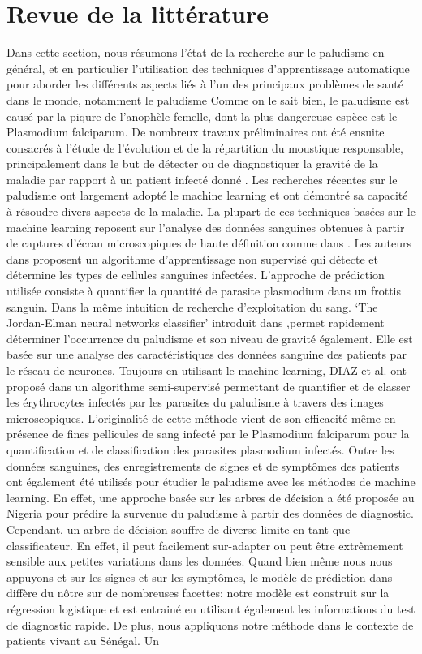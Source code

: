\section{Revue de la littérature}\label{Revue de la littérature}
Dans cette section, nous résumons l’état de la recherche sur le paludisme en général, et en particulier l’utilisation des techniques d’apprentissage automatique pour aborder les différents aspects liés à l’un des principaux problèmes de santé dans le monde, notamment le paludisme
Comme on le sait bien, le paludisme est causé par la piqure de l’anophèle femelle, dont la plus dangereuse espèce est le Plasmodium falciparum. De nombreux travaux préliminaires ont été ensuite consacrés à l’étude de l’évolution et de la répartition du moustique responsable, principalement dans le but de détecter ou de diagnostiquer la gravité de la maladie par rapport à un patient infecté donné \cite{Fe03,Al09}. Les recherches récentes sur le paludisme ont largement adopté le machine learning et ont démontré sa capacité à résoudre divers aspects de la maladie. La plupart de ces techniques basées sur le machine learning reposent sur l'analyse des données sanguines obtenues à partir de captures d'écran microscopiques de haute définition comme dans \cite{Ku18}. Les auteurs dans\cite{Ku18} proposent un algorithme d'apprentissage non supervisé qui détecte et détermine les types de cellules sanguines infectées. L’approche de prédiction utilisée consiste à quantifier la quantité de parasite plasmodium dans un frottis sanguin. Dans la même intuition de recherche d’exploitation du sang. ‘The Jordan-Elman neural networks classifier’ introduit dans \cite{Ha15},permet rapidement déterminer l'occurrence du paludisme et son niveau de gravité également. Elle est basée sur une analyse des caractéristiques des données sanguine des patients par le réseau de neurones. Toujours en utilisant le machine learning, DIAZ et al. ont proposé dans \cite{Dia09} un algorithme semi-supervisé permettant de quantifier et de classer les érythrocytes infectés par les parasites du paludisme à travers des images microscopiques. L'originalité de cette méthode vient de son efficacité même en présence de fines pellicules de sang infecté par le Plasmodium falciparum pour la quantification et de classification des parasites plasmodium infectés. Outre les données sanguines, des enregistrements de signes et de symptômes des patients ont également été utilisés pour étudier le paludisme avec les méthodes  de machine learning. En effet, une approche basée sur les arbres de décision a été proposée au Nigeria \cite{Ug10} pour prédire la survenue du paludisme à partir des données de diagnostic. Cependant, un arbre de décision souffre de diverse limite en tant que classificateur. En effet, il peut facilement sur-adapter ou peut être extrêmement sensible aux petites variations dans les données. Quand bien même nous nous appuyons et sur les signes et sur les symptômes, le modèle de prédiction dans\cite{Ug10} diffère du nôtre sur de nombreuses facettes: notre modèle est construit sur la régression logistique et est entrainé  en utilisant également les informations du test de diagnostic rapide. De plus, nous appliquons notre méthode dans le contexte de patients vivant au Sénégal. Un 